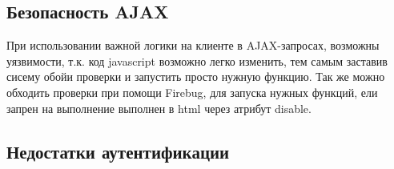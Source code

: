 \documentclass[11pt, a4paper]{article}		%
\begin{document}
\subsection{Безопасность AJAX}

При использовании важной логики на клиенте в AJAX-запросах, возможны уязвимости, т.к. код javascript возможно легко изменить, тем самым заставив сисему обойи проверки и запустить просто нужную функцию. Так же можно обходить проверки при помощи Firebug, для запуска нужных функций, ели запрен на выполнение выполнен в html через атрибут disable.





\subsection{Недостатки аутентификации}
\end{document}
